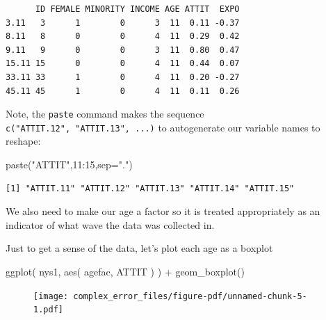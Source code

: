 \documentclass[
  letterpaper,
  DIV=11,
  numbers=noendperiod]{scrreprt}
\newenvironment{Shaded}{\begin{snugshade}}{\end{snugshade}}
\newcommand{\AttributeTok}[1]{\textcolor[rgb]{0.49,0.56,0.16}{#1}}
\newcommand{\DecValTok}[1]{\textcolor[rgb]{0.25,0.63,0.44}{#1}}
\newcommand{\FunctionTok}[1]{\textcolor[rgb]{0.02,0.16,0.49}{#1}}
\newcommand{\NormalTok}[1]{\textcolor[rgb]{0.00,0.44,0.13}{#1}}
\newcommand{\OtherTok}[1]{\textcolor[rgb]{0.00,0.44,0.13}{#1}}
\newcommand{\SpecialCharTok}[1]{\textcolor[rgb]{0.25,0.44,0.63}{#1}}
\newcommand{\StringTok}[1]{\textcolor[rgb]{0.25,0.44,0.63}{#1}}
\begin{document}
\begin{verbatim}
      ID FEMALE MINORITY INCOME AGE ATTIT  EXPO
3.11   3      1        0      3  11  0.11 -0.37
8.11   8      0        0      4  11  0.29  0.42
9.11   9      0        0      3  11  0.80  0.47
15.11 15      0        0      4  11  0.44  0.07
33.11 33      1        0      4  11  0.20 -0.27
45.11 45      1        0      4  11  0.11  0.26
\end{verbatim}

Note, the \texttt{paste} command makes the sequence
\texttt{c("ATTIT.12",\ "ATTIT.13",\ ...)} to autogenerate our variable
names to reshape:

\begin{Shaded}
\begin{Highlighting}[]
\FunctionTok{paste}\NormalTok{(}\StringTok{"ATTIT"}\NormalTok{,}\DecValTok{11}\SpecialCharTok{:}\DecValTok{15}\NormalTok{,}\AttributeTok{sep=}\StringTok{"."}\NormalTok{)}
\end{Highlighting}
\end{Shaded}

\begin{verbatim}
[1] "ATTIT.11" "ATTIT.12" "ATTIT.13" "ATTIT.14" "ATTIT.15"
\end{verbatim}

We also need to make our age a factor so it is treated appropriately as
an indicator of what wave the data was collected in.

\begin{Shaded}
\end{Shaded}

Just to get a sense of the data, let's plot each age as a boxplot

\begin{Shaded}
\begin{Highlighting}[]
\FunctionTok{ggplot}\NormalTok{( nys1, }\FunctionTok{aes}\NormalTok{( agefac, ATTIT ) ) }\SpecialCharTok{+}
  \FunctionTok{geom\_boxplot}\NormalTok{()}
\end{Highlighting}
\end{Shaded}

\begin{figure}[H]

{\centering \texttt{[image: complex\_error\_files/figure-pdf/unnamed-chunk-5-1.pdf]}

}

\end{figure}
\end{document}
